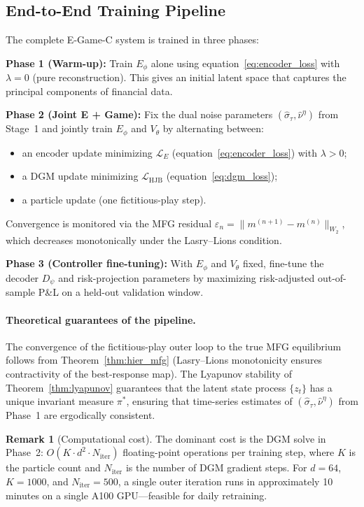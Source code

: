 \documentclass[12pt,a4paper]{article}
\theoremstyle{plain}
\theoremstyle{definition}
\newtheorem{remark}[theorem]{Remark}
\newcommand{\1}{\mathbbm{1}}
\begin{document}
\subsection{End-to-End Training Pipeline}
\label{subsec:e2e}

The complete E-Game-C system is trained in three phases:

\textbf{Phase 1 (Warm-up):}  Train $E_\phi$ alone using
equation~\eqref{eq:encoder_loss} with $\lambda = 0$ (pure reconstruction).
This gives an initial latent space that captures the principal components of
financial data.

\textbf{Phase 2 (Joint E + Game):}  Fix the dual noise parameters
$(\hat\sigma_\tau, \hat\nu^\eta)$ from Stage~1 and jointly train $E_\phi$ and
$V_\theta$ by alternating between:
\begin{itemize}
  \item an encoder update minimizing $\mathcal{L}_E$ (equation~\eqref{eq:encoder_loss}) with $\lambda > 0$;
  \item a DGM update minimizing $\mathcal{L}_\mathrm{HJB}$ (equation~\eqref{eq:dgm_loss});
  \item a particle update (one fictitious-play step).
\end{itemize}
Convergence is monitored via the MFG residual
$\varepsilon_n = \|m^{(n+1)} - m^{(n)}\|_{W_2}$, which decreases monotonically
under the Lasry–Lions condition.

\textbf{Phase 3 (Controller fine-tuning):}  With $E_\phi$ and $V_\theta$ fixed,
fine-tune the decoder $D_\psi$ and risk-projection parameters by maximizing
risk-adjusted out-of-sample P\&L on a held-out validation window.

\paragraph{Theoretical guarantees of the pipeline.}
The convergence of the fictitious-play outer loop to the true MFG equilibrium
follows from Theorem~\ref{thm:hier_mfg} (Lasry–Lions monotonicity ensures
contractivity of the best-response map).  The Lyapunov stability of
Theorem~\ref{thm:lyapunov} guarantees that the latent state process
$\{z_t\}$ has a unique invariant measure $\pi^*$, ensuring that
time-series estimates of $(\hat\sigma_\tau, \hat\nu^\eta)$ from Phase~1 are
ergodically consistent.

\begin{remark}[Computational cost]
The dominant cost is the DGM solve in Phase~2: $O(K \cdot d^2 \cdot N_\mathrm{iter})$
floating-point operations per training step, where $K$ is the particle count and
$N_\mathrm{iter}$ is the number of DGM gradient steps.  For $d=64$, $K=1000$,
and $N_\mathrm{iter}=500$, a single outer iteration runs in approximately
10 minutes on a single A100 GPU—feasible for daily retraining.
\end{remark}
\end{document}
